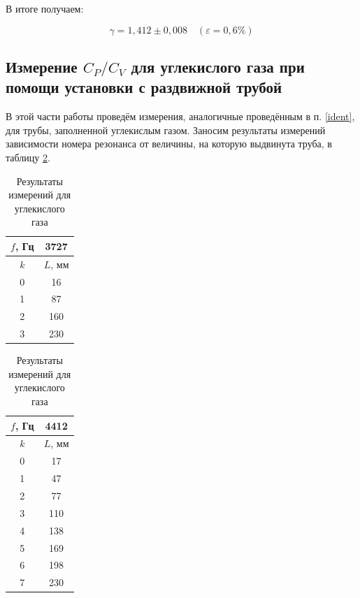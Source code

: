 \documentclass[a4paper,12pt]{article}
\theoremstyle{definition}
\begin{document}
	В итоге получаем:
	
	\[ \boxed{\gamma = 1,412 \pm 0,008}\quad (\varepsilon=0,6\%) \]
	
	\subsection{Измерение $ C_P/C_V $ для углекислого газа при помощи установки с раздвижной трубой}
	
	В этой части работы проведём измерения, аналогичные проведённым в п. \ref{ident}, для трубы, заполненной углекислым газом. Заносим результаты измерений зависимости номера резонанса от величины, на которую выдвинута труба, в таблицу \ref{tab:CO2}.

	\begin{table}[!htb]
		
		\begin{minipage}{.5\linewidth}
			\centering
			\begin{tabular}{|c|c|}
				\hline
				$ f $, Гц & 3727  \\ \hline
				$ k $ & $  L $, мм   \\ \hline
				0 & 16 \\ \hline
				1 & 87 \\ \hline
				2 & 160 \\ \hline
				3 & 230 \\ \hline
			\end{tabular}
		\end{minipage}%
		\begin{minipage}{.5\linewidth}
			\centering
			\begin{tabular}{|c|c|}
				\hline
				$ f $, Гц & 4412  \\ \hline
				$ k $ & $  L $, мм   \\ \hline
				0 & 17 \\ \hline
				1 & 47 \\ \hline
				2 & 77 \\ \hline
				3 & 110 \\ \hline
				4 & 138 \\ \hline
				5 & 169 \\ \hline
				6 & 198 \\ \hline
				7 & 230 \\ \hline
			\end{tabular}
		\end{minipage}
		\caption{Результаты измерений для углекислого газа}
		\label{tab:CO2}
	\end{table}
	
\end{document}
